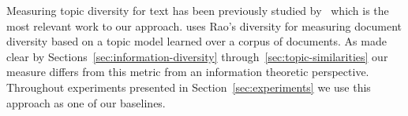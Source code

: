 Measuring topic diversity for text has been previously studied by~\cite{bache:2013} which is the most relevant work to our approach. \cite{bache:2013} uses Rao's diversity \cite{rao:1982} for measuring document diversity based on a topic model learned over a corpus of documents. As made clear by Sections~\ref{sec:information-diversity} through~\ref{sec:topic-similarities} our measure differs from this metric from an information theoretic perspective. Throughout experiments presented in Section~\ref{sec:experiments} we use this approach as one of our baselines.